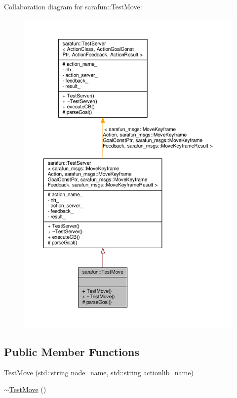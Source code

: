 Collaboration diagram for sarafun\-:\-:Test\-Move\-:
\nopagebreak
\begin{figure}[H]
\begin{center}
\leavevmode
\includegraphics[width=350pt]{dc/def/classsarafun_1_1TestMove__coll__graph}
\end{center}
\end{figure}
\subsection*{Public Member Functions}
\begin{DoxyCompactItemize}
\item 
\hyperlink{classsarafun_1_1TestMove_ae9653a964d20cf520a9a9f51c73df36b_ae9653a964d20cf520a9a9f51c73df36b}{Test\-Move} (std\-::string node\-\_\-name, std\-::string actionlib\-\_\-name)
\item 
\hyperlink{classsarafun_1_1TestMove_a5e1d99c97f17c188913a0d8d6d1de927_a5e1d99c97f17c188913a0d8d6d1de927}{$\sim$\-Test\-Move} ()
\end{DoxyCompactItemize}
